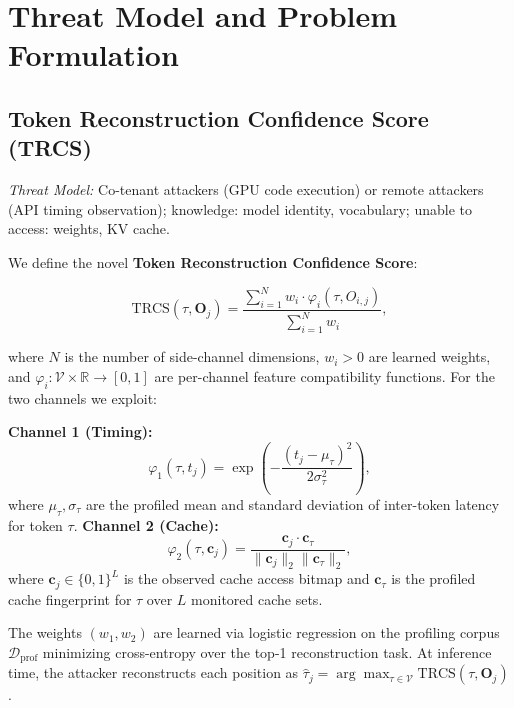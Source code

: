 \documentclass[conference,10pt,twocolumn]{IEEEtran}
\begin{document}
\section{Threat Model and Problem Formulation}
\label{sec:threat}

\subsection{Token Reconstruction Confidence Score (TRCS)}

\emph{Threat Model:} Co-tenant attackers (GPU code execution) or remote attackers
(API timing observation); knowledge: model identity, vocabulary; unable to access: weights, KV cache.

\medskip

We define the novel \textbf{Token Reconstruction Confidence Score}:

\begin{equation}
  \mathrm{TRCS}(\tau, \mathbf{O}_j)
  = \frac{\sum_{i=1}^{N} w_i \cdot \varphi_i(\tau, O_{i,j})}
         {\sum_{i=1}^{N} w_i},
  \label{eq:trcs}
\end{equation}

where $N$ is the number of side-channel dimensions, $w_i > 0$
are learned weights, and $\varphi_i : \mathcal{V} \times
\mathbb{R} \to [0,1]$ are per-channel feature compatibility
functions. For the two channels we exploit:

\textbf{Channel 1 (Timing):}
\begin{equation}
  \varphi_1(\tau, t_j) = \exp\!\left(
    -\frac{(t_j - \mu_\tau)^2}{2\sigma_\tau^2}
  \right),
  \label{eq:phi1}
\end{equation}
where $\mu_\tau, \sigma_\tau$ are the profiled mean and standard
deviation of inter-token latency for token $\tau$.
\textbf{Channel 2 (Cache):}
\begin{equation}
  \varphi_2(\tau, \mathbf{c}_j) =
  \frac{\mathbf{c}_j \cdot \mathbf{c}_\tau}
       {\|\mathbf{c}_j\|_2 \|\mathbf{c}_\tau\|_2},
  \label{eq:phi2}
\end{equation}
where $\mathbf{c}_j \in \{0,1\}^L$ is the observed cache
access bitmap and $\mathbf{c}_\tau$ is the profiled cache
fingerprint for $\tau$ over $L$ monitored cache sets.

The weights $(w_1, w_2)$ are learned via logistic regression
on the profiling corpus $\mathcal{D}_{\mathrm{prof}}$
minimizing cross-entropy over the top-1 reconstruction task.
At inference time, the attacker reconstructs each position
as $\hat{\tau}_j = \arg\max_{\tau \in \mathcal{V}}
\mathrm{TRCS}(\tau, \mathbf{O}_j)$.
\end{document}
